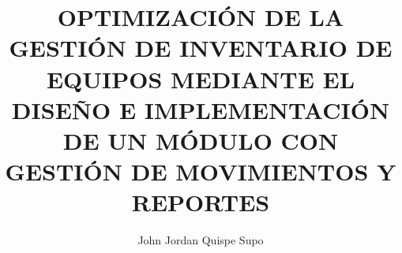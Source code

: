 \documentclass[stu, 12pt, letterpaper, donotrepeattitle, floatsintext, natbib]{apa7}
\title{OPTIMIZACIÓN DE LA GESTIÓN DE INVENTARIO DE EQUIPOS MEDIANTE EL DISEÑO E IMPLEMENTACIÓN DE UN MÓDULO CON GESTIÓN DE MOVIMIENTOS Y REPORTES}
\author{John Jordan Quispe Supo}
\begin{document}
\maketitle
\renewcommand\refname{\textbf{Bibliografía}}
\renewcommand\contentsname{Índice}
\tableofcontents
\setcounter{tocdepth}{2}
\newpage
\renewcommand\listfigurename{Índice de Figuras}
\listoffigures
\newpage
\renewcommand\listtablename{Índice de Tablas}
\listoftables
\newpage
\renewcommand\lstlistlistingname{Índice de Códigos}
\renewcommand\lstlistingname{\textbf{Código}}
\lstlistoflistings\newpage




\end{document}

